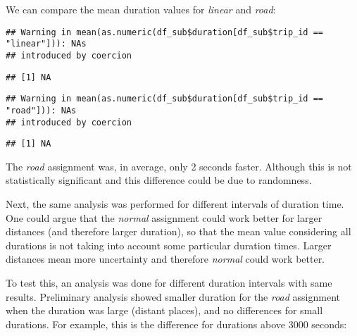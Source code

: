 \documentclass[
]{article}
\newenvironment{Shaded}{\begin{snugshade}}{\end{snugshade}}
\newcommand{\FunctionTok}[1]{\textcolor[rgb]{0.00,0.00,0.00}{#1}}
\newcommand{\NormalTok}[1]{#1}
\newcommand{\SpecialCharTok}[1]{\textcolor[rgb]{0.00,0.00,0.00}{#1}}
\newcommand{\StringTok}[1]{\textcolor[rgb]{0.31,0.60,0.02}{#1}}
\begin{document}
We can compare the mean duration values for \emph{linear} and
\emph{road}:

\begin{Shaded}
\end{Shaded}

\begin{verbatim}
## Warning in mean(as.numeric(df_sub$duration[df_sub$trip_id == "linear"])): NAs
## introduced by coercion
\end{verbatim}

\begin{verbatim}
## [1] NA
\end{verbatim}

\begin{Shaded}
\end{Shaded}

\begin{verbatim}
## Warning in mean(as.numeric(df_sub$duration[df_sub$trip_id == "road"])): NAs
## introduced by coercion
\end{verbatim}

\begin{verbatim}
## [1] NA
\end{verbatim}

The \emph{road} assignment was, in average, only 2 seconds faster.
Although this is not statistically significant and this difference could
be due to randomness.

Next, the same analysis was performed for different intervals of
duration time. One could argue that the \emph{normal} assignment could
work better for larger distances (and therefore larger duration), so
that the mean value considering all durations is not taking into account
some particular duration times. Larger distances mean more uncertainty
and therefore \emph{normal} could work better.

To test this, an analysis was done for different duration intervals with
same results. Preliminary analysis showed smaller duration for the
\emph{road} assignment when the duration was large (distant places), and
no differences for small durations. For example, this is the difference
for durations above 3000 seconds:
\end{document}
